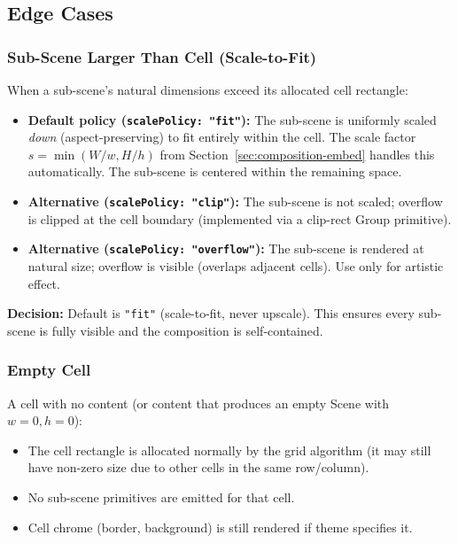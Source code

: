 \subsection{Edge Cases}
\label{sec:composition-edge-cases}

\subsubsection{Sub-Scene Larger Than Cell (Scale-to-Fit)}

When a sub-scene's natural dimensions exceed its allocated cell rectangle:

\begin{itemize}
  \item \textbf{Default policy (\texttt{scalePolicy: "fit"}):} The sub-scene is uniformly scaled \emph{down} (aspect-preserving) to fit entirely within the cell.  The scale factor $s = \min(W/w, H/h)$ from Section~\ref{sec:composition-embed} handles this automatically.  The sub-scene is centered within the remaining space.
  \item \textbf{Alternative (\texttt{scalePolicy: "clip"}):} The sub-scene is not scaled; overflow is clipped at the cell boundary (implemented via a clip-rect Group primitive).
  \item \textbf{Alternative (\texttt{scalePolicy: "overflow"}):} The sub-scene is rendered at natural size; overflow is visible (overlaps adjacent cells).  Use only for artistic effect.
\end{itemize}

\textbf{Decision:} Default is \texttt{"fit"} (scale-to-fit, never upscale).  This ensures every sub-scene is fully visible and the composition is self-contained.

\subsubsection{Empty Cell}

A cell with no content (or content that produces an empty Scene with $w=0, h=0$):
\begin{itemize}
  \item The cell rectangle is allocated normally by the grid algorithm (it may still have non-zero size due to other cells in the same row/column).
  \item No sub-scene primitives are emitted for that cell.
  \item Cell chrome (border, background) is still rendered if theme specifies it.
\end{itemize}

